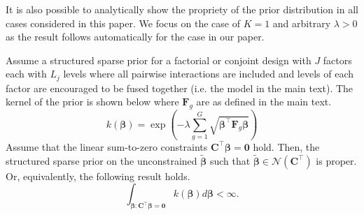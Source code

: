 It is also possible to analytically show the propriety of the prior
distribution in all cases considered in this paper. We focus on the
case of $K = 1$ and arbitrary $\lambda > 0$ as the result follows
automatically for the case in our paper. 
\begin{result}
	\label{thm:proper_prior}
	Assume a structured sparse prior for a factorial or conjoint
        design with $J$ factors each with $L_j$ levels where all
        pairwise interactions are included and levels of each factor
        are encouraged to be fused together (i.e. the model in the
        main text). The kernel of the prior is shown below where
        $\bm{F}_g$ are as defined in the main text. 	
	$$k(\bm{\beta}) = \exp\left(-\lambda \sum_{g=1}^G \sqrt{\bm{\beta}^\top \bm{F}_g \bm{\beta}}\right)$$
	Assume that the linear sum-to-zero constraints
        $\bm{C}^\top \bm{\beta} = \bm{0}$ hold.  Then, the structured
        sparse prior on the unconstrained $\tilde{\bm{\beta}}$ such
        that $\tilde{\bm{\beta}} \in \mathcal{N}(\bm{C}^\top)$ is
        proper. Or, equivalently, the following result holds.
	$$\int_{\bm{\beta}: \bm{C}^\top \bm{\beta} = \bm{0}} k(\bm{\beta}) d\bm{\beta} < \infty.$$
\end{result}
